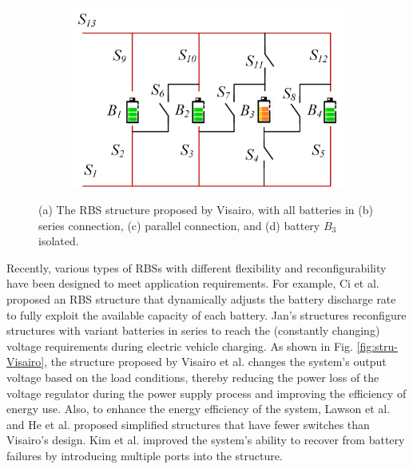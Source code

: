 \documentclass{article}
\begin{document}
\begin{figure}[htbp]
\begin{subfigure}[b]{0.45\textwidth}
        \caption{}
        \label{fig:stru-Visairo-parallel}
    \end{subfigure}
    \hspace{0.05\textwidth}
    \begin{subfigure}[b]{0.45\textwidth}
        \includegraphics[width=\textwidth]{stru-V-isolate.png}
        \caption{}
        \label{fig:stru-Visairo-isolate}
    \end{subfigure}
    \caption{
        (a) The RBS structure proposed by Visairo\cite{visairoReconfigurableBatteryPack2008}, with
        all batteries in (b) series connection, (c) parallel connection, and
        (d) battery $B_3$ isolated.
        }
    \label{fig:arch}
\end{figure}

Recently, various types of RBSs with different flexibility and reconfigurability have been designed to meet application requirements. 
For example, Ci et al. \cite{ci2007novel} proposed an RBS structure that dynamically adjusts the battery discharge rate to fully exploit the available capacity of each battery. 
Jan's \cite{9209774,engelhardt2021double} structures  reconfigure structures with variant batteries in series to reach the (constantly changing) voltage requirements during electric vehicle charging.
As shown in Fig. \ref{fig:stru-Visairo}, the structure proposed by Visairo et al. \cite{visairoReconfigurableBatteryPack2008}  changes the system's output voltage based on the load conditions, thereby reducing the power loss of the voltage regulator during the power supply process and improving the efficiency of energy use. 
Also, to enhance the energy efficiency of the system, Lawson et al. \cite{lawsonSoftwareConfigurableBattery2012} and He et al. \cite{he2014reconfiguration}  proposed simplified structures that have fewer switches than Visairo's design.
Kim et al. \cite{kim2009dynamic} improved the system's ability to recover from battery failures by introducing multiple ports into the structure. 
\end{document}
